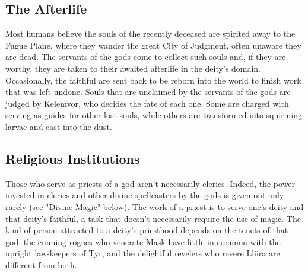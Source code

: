\documentclass[10pt,a4paper,twoside,twocolumn,openany,bg=print,nodeprecatedcode]{dndbook}
\begin{document}
\subsection{The Afterlife}
Most humans believe the souls of the recently deceased are spirited away to the Fugue Plane, where they wander the great City of Judgment, often unaware they are dead. The servants of the gods come to collect such souls and, if they are worthy, they are taken to their awaited afterlife in the deity's domain. Occasionally, the faithful are sent back to be reborn into the world to finish work that was left undone.
Souls that are unclaimed by the servants of the gods are judged by Kelemvor, who decides the fate of each one. Some are charged with serving as guides for other lost souls, while others are transformed into squirming larvae and cast into the dust.
\subsection{Religious Institutions}
Those who serve as priests of a god aren't necessarily clerics. Indeed, the power invested in clerics and other divine spellcasters by the gods is given out only rarely (see "Divine Magic" below). The work of a priest is to serve one's deity and that deity's faithful, a task that doesn't necessarily require the use of magic.
The kind of person attracted to a deity's priesthood depends on the tenets of that god: the cunning rogues who venerate Mask have little in common with the upright law-keepers of Tyr, and the delightful revelers who revere Lliira are different from both.
\end{document}
